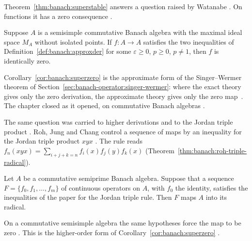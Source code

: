 Theorem~\ref{thm:banach:superstable} answers a question raised by
Watanabe \cite[p.~526]{MiuraHirasawaTakahasi2006}. On functions it has a zero
consequence \cite[Corollary~3, p.~525]{MiuraHirasawaTakahasi2006}.

\begin{corollary}\label{cor:banach:superzero}
Suppose $A$ is a semisimple commutative Banach algebra with the maximal
ideal space $M_A$ without isolated points. If $f:A\to A$ satisfies the two
inequalities of Definition~\ref{def:banach:approxder} for some
$\varepsilon\ge 0$, $p\ge 0$, $p\ne 1$, then $f$ is identically zero.
\end{corollary}

Corollary~\ref{cor:banach:superzero} is the approximate form of the
Singer--Wermer theorem of
Section~\ref{sec:banach-operator:singer-wermer}: where the exact theory
gives only the zero derivation, the approximate theory gives only the zero
map~\cite[Corollary~3, p.~525]{MiuraHirasawaTakahasi2006}. The chapter closed as it opened, on commutative Banach algebras
\cite[Corollary~3, p.~525]{MiuraHirasawaTakahasi2006}.

The same question was carried to higher derivations and to the Jordan triple
product \cite[p.~1975]{RohJungChang2009Triple}. Roh, Jung and Chang control a
sequence of maps by an inequality for the Jordan triple product $xyx$
\cite[p.~1976]{RohJungChang2009Triple}. The rule reads
$f_n(xyx)=\sum_{i+j+k=n}f_i(x)f_j(y)f_k(x)$
(Theorem~\ref{thm:banach:roh-triple-radical}).

\begin{theorem}\label{thm:banach:roh-triple-radical}
Let $A$ be a commutative semiprime Banach algebra. Suppose that a sequence
$F=\{f_0,f_1,\dots,f_m\}$ of continuous operators on $A$, with $f_0$ the
identity, satisfies the inequalities of the paper for the Jordan triple rule.
Then $F$ maps $A$ into its radical.
\end{theorem}

On a commutative semisimple algebra the same hypotheses force the map to be
zero \cite[Corollary~2.8, p.~1985]{RohJungChang2009Triple}. This is the
higher-order form of Corollary~\ref{cor:banach:superzero}
\cite[p.~1986]{RohJungChang2009Triple}.

